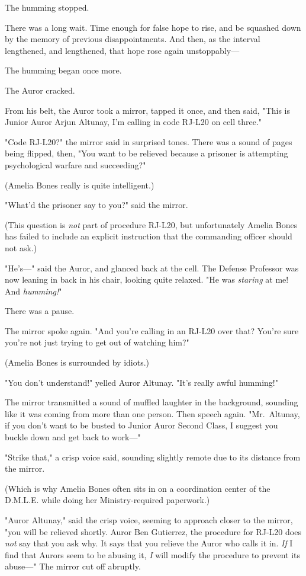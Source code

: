 The humming stopped.

There was a long wait. Time enough for false hope to rise, and be squashed down
by the memory of previous disappointments. And then, as the interval
lengthened, and lengthened, that hope rose again unstoppably---

The humming began once more.

The Auror cracked.

From his belt, the Auror took a mirror, tapped it once, and then said, "This is
Junior Auror Arjun Altunay, I'm calling in code RJ-L20 on cell three."

"Code RJ-L20?" the mirror said in surprised tones. There was a sound of pages
being flipped, then, "You want to be relieved because a prisoner is attempting
psychological warfare and succeeding?"

(Amelia Bones really is quite intelligent.)

"What'd the prisoner say to you?" said the mirror.

(This question is \emph{not} part of procedure RJ-L20, but unfortunately Amelia
Bones has failed to include an explicit instruction that the commanding officer
should not ask.)

"He's\mbox{---}" said the Auror, and glanced back at the cell. The Defense Professor
was now leaning in back in his chair, looking quite relaxed. "He was
\emph{staring} at me! And \emph{humming!}"

There was a pause.

The mirror spoke again. "And you're calling in an RJ-L20 over that? You're sure
you're not just trying to get out of watching him?"

(Amelia Bones is surrounded by idiots.)

"You don't understand!" yelled Auror Altunay. "It's really awful humming!"

The mirror transmitted a sound of muffled laughter in the background, sounding
like it was coming from more than one person. Then speech again. "Mr.~Altunay,
if you don't want to be busted to Junior Auror Second Class, I suggest you
buckle down and get back to work\mbox{---}"

"Strike that," a crisp voice said, sounding slightly remote due to its distance
from the mirror.

(Which is why Amelia Bones often sits in on a coordination center of the
D.M.L.E. while doing her Ministry-required paperwork.)

"Auror Altunay," said the crisp voice, seeming to approach closer to the
mirror, "you will be relieved shortly. Auror Ben Gutierrez, the procedure for
RJ-L20 does \emph{not} say that you ask why. It says that you relieve the Auror
who calls it in. \emph{If} I find that Aurors seem to be abusing it, \emph{I}
will modify the procedure to prevent its abuse\mbox{---}" The mirror cut off abruptly.

